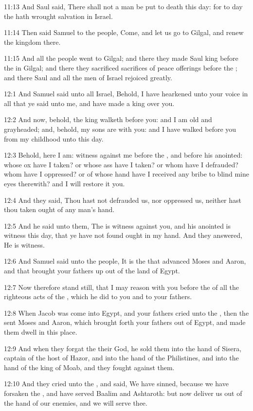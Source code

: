 11:13 And Saul said, There shall not a man be put to death this day:
for to day the \LORD hath wrought salvation in Israel.

11:14 Then said Samuel to the people, Come, and let us go to Gilgal,
and renew the kingdom there.

11:15 And all the people went to Gilgal; and there they made Saul king
before the \LORD in Gilgal; and there they sacrificed sacrifices of
peace offerings before the \LORD; and there Saul and all the men of
Israel rejoiced greatly.

12:1 And Samuel said unto all Israel, Behold, I have hearkened unto
your voice in all that ye said unto me, and have made a king over you.

12:2 And now, behold, the king walketh before you: and I am old and
grayheaded; and, behold, my sons are with you: and I have walked
before you from my childhood unto this day.

12:3 Behold, here I am: witness against me before the \LORD, and before
his anointed: whose ox have I taken? or whose ass have I taken? or
whom have I defrauded? whom have I oppressed? or of whose hand have I
received any bribe to blind mine eyes therewith? and I will restore it
you.

12:4 And they said, Thou hast not defrauded us, nor oppressed us,
neither hast thou taken ought of any man's hand.

12:5 And he said unto them, The \LORD is witness against you, and his
anointed is witness this day, that ye have not found ought in my hand.
And they answered, He is witness.

12:6 And Samuel said unto the people, It is the \LORD that advanced
Moses and Aaron, and that brought your fathers up out of the land of
Egypt.

12:7 Now therefore stand still, that I may reason with you before the
\LORD of all the righteous acts of the \LORD, which he did to you and to
your fathers.

12:8 When Jacob was come into Egypt, and your fathers cried unto the
\LORD, then the \LORD sent Moses and Aaron, which brought forth your
fathers out of Egypt, and made them dwell in this place.

12:9 And when they forgat the \LORD their God, he sold them into the
hand of Sisera, captain of the host of Hazor, and into the hand of the
Philistines, and into the hand of the king of Moab, and they fought
against them.

12:10 And they cried unto the \LORD, and said, We have sinned, because
we have forsaken the \LORD, and have served Baalim and Ashtaroth: but
now deliver us out of the hand of our enemies, and we will serve thee.

